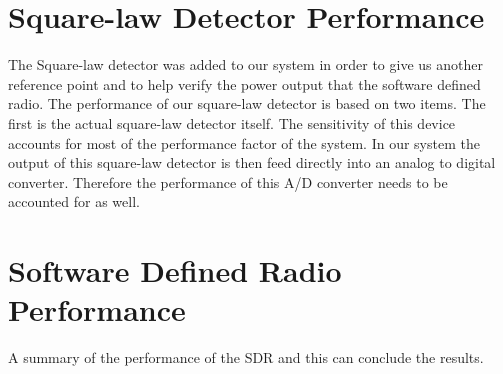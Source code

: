 \section{Square-law Detector Performance}
The Square-law detector was added to our system in order to give us another reference point and to help verify the power output that the software defined radio.  The performance of our square-law detector is based on two items.  The first is the actual square-law detector itself.  The sensitivity of this device accounts for most of the performance factor of the system.  In our system the output of this square-law detector is then feed directly into an analog to digital converter.  Therefore the performance of this A/D converter needs to be accounted for as well.  


\section{Software Defined Radio Performance}

A summary of the performance of the SDR and this can conclude the results.


